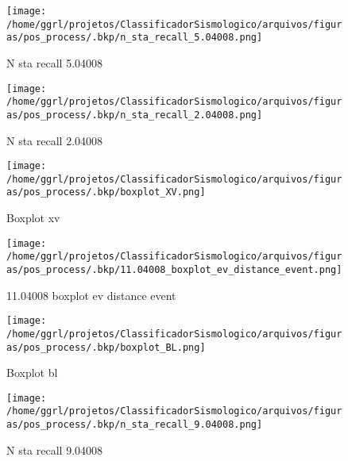                     \begin{figure}[H]
                        \centering
                        \texttt{[image: /home/ggrl/projetos/ClassificadorSismologico/arquivos/figuras/pos\_process/.bkp/n\_sta\_recall\_5.04008.png]}
                        \caption{N sta recall 5.04008}
                        \label{fig:n_sta_recall_5.04008}
                    \end{figure}
                

                    \begin{figure}[H]
                        \centering
                        \texttt{[image: /home/ggrl/projetos/ClassificadorSismologico/arquivos/figuras/pos\_process/.bkp/n\_sta\_recall\_2.04008.png]}
                        \caption{N sta recall 2.04008}
                        \label{fig:n_sta_recall_2.04008}
                    \end{figure}
                

                    \begin{figure}[H]
                        \centering
                        \texttt{[image: /home/ggrl/projetos/ClassificadorSismologico/arquivos/figuras/pos\_process/.bkp/boxplot\_XV.png]}
                        \caption{Boxplot xv}
                        \label{fig:boxplot_XV}
                    \end{figure}
                

                    \begin{figure}[H]
                        \centering
                        \texttt{[image: /home/ggrl/projetos/ClassificadorSismologico/arquivos/figuras/pos\_process/.bkp/11.04008\_boxplot\_ev\_distance\_event.png]}
                        \caption{11.04008 boxplot ev distance event}
                        \label{fig:11.04008_boxplot_ev_distance_event}
                    \end{figure}
                

                    \begin{figure}[H]
                        \centering
                        \texttt{[image: /home/ggrl/projetos/ClassificadorSismologico/arquivos/figuras/pos\_process/.bkp/boxplot\_BL.png]}
                        \caption{Boxplot bl}
                        \label{fig:boxplot_BL}
                    \end{figure}
                

                    \begin{figure}[H]
                        \centering
                        \texttt{[image: /home/ggrl/projetos/ClassificadorSismologico/arquivos/figuras/pos\_process/.bkp/n\_sta\_recall\_9.04008.png]}
                        \caption{N sta recall 9.04008}
                        \label{fig:n_sta_recall_9.04008}
                    \end{figure}
                

